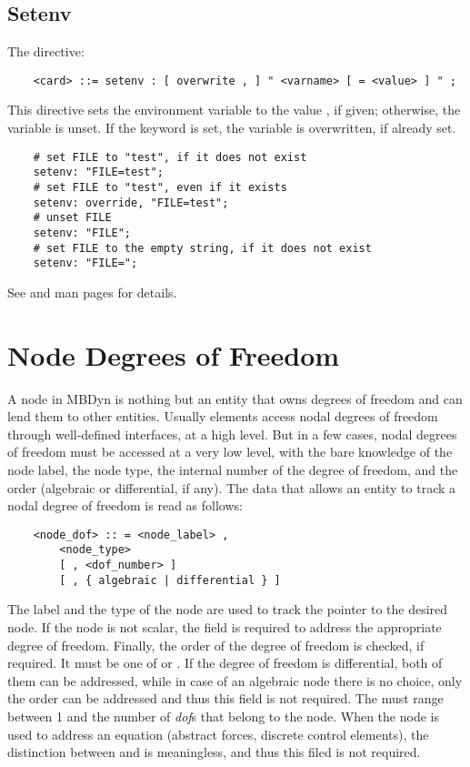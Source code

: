 \subsection{Setenv}
The  directive:
\begin{verbatim}
    <card> ::= setenv : [ overwrite , ] " <varname> [ = <value> ] " ;
\end{verbatim}
This directive sets the environment variable  
to the value , if given; otherwise, the variable
is unset.
If the keyword  is set, the variable is overwritten, 
if already set.
\begin{verbatim}
    # set FILE to "test", if it does not exist
    setenv: "FILE=test";
    # set FILE to "test", even if it exists
    setenv: override, "FILE=test";
    # unset FILE
    setenv: "FILE";
    # set FILE to the empty string, if it does not exist
    setenv: "FILE=";
\end{verbatim}
See  and  man pages for details.



\section{Node Degrees of Freedom}\label{sec:NODEDOF}
A node in MBDyn is nothing but an entity that owns degrees of freedom and
can lend them to other entities. 
Usually elements access nodal degrees of freedom through well-defined
interfaces, at a high level. 
But in a few cases, nodal degrees of freedom must be accessed
at a very low level, with the bare knowledge of the node label,
the node type,
the internal number of the degree of freedom, and the order 
(algebraic or differential, if any).
The data that allows an entity to track a nodal degree of freedom
is read as follows:
\begin{verbatim}
    <node_dof> :: = <node_label> , 
        <node_type> 
        [ , <dof_number> ]
        [ , { algebraic | differential } ]
\end{verbatim}
The label and the type of the node are used to track the pointer to the
desired node. 
If the node is not scalar, the  field is required
to address the appropriate degree of freedom.
Finally, the order of the degree of freedom is checked, if required.
It must be one of  or .
If the  degree of freedom is differential, both
of them can be addressed, while in case of an algebraic node there is no
choice, only the  order can be addressed and thus this field
is not required.
The  must range between 1 and the number of \emph{dof}s that
belong to the node.
When the node is used to address an equation (abstract forces, 
discrete control elements), the distinction between  
and  is meaningless, and thus this filed is not required.




